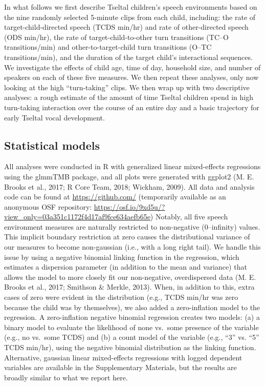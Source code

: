 \documentclass[floatsintext,man]{apa6}
\theoremstyle{definition}
\theoremstyle{definition}
\theoremstyle{definition}
\theoremstyle{remark}
\begin{document}
In what follows we first describe Tseltal children's speech environments
based on the nine randomly selected 5-minute clips from each child,
including: the rate of target-child-directed speech (TCDS min/hr) and
rate of other-directed speech (ODS min/hr), the rate of
target-child-to-other turn transitions (TC--O transitions/min) and
other-to-target-child turn transitions (O--TC transitions/min), and the
duration of the target child's interactional sequences. We investigate
the effects of child age, time of day, household size, and number of
speakers on each of these five measures. We then repeat these analyses,
only now looking at the high \enquote{turn-taking} clips. We then wrap
up with two descriptive analyses: a rough estimate of the amount of time
Tseltal children spend in high turn-taking interaction over the course
of an entire day and a basic trajectory for early Tseltal vocal
development.

\subsection{Statistical models}\label{statistical-models}

All analyses were conducted in R with generalized linear mixed-effects
regressions using the glmmTMB package, and all plots were generated with
ggplot2 (M. E. Brooks et al., 2017; R Core Team, 2018; Wickham, 2009).
All data and analysis code can be found at \url{https://github.com/}
(temporarily available as an anonymous OSF repository:
\url{https://osf.io/9xd5u/?view_only=03a351c1172f4d17af9fce634aefb65e})
Notably, all five speech environment measures are naturally restricted
to non-negative (0--infinity) values. This implicit boundary restriction
at zero causes the distributional variance of our measures to become
non-gaussian (i.e., with a long right tail). We handle this issue by
using a negative binomial linking function in the regression, which
estimates a dispersion parameter (in addition to the mean and variance)
that allows the model to more closely fit our non-negative,
overdispersed data (M. E. Brooks et al., 2017; Smithson \& Merkle,
2013). When, in addition to this, extra cases of zero were evident in
the distribution (e.g., TCDS min/hr was zero because the child was by
themselves), we also added a zero-inflation model to the regression. A
zero-inflation negative binomial regression creates two models: (a) a
binary model to evaluate the likelihood of none vs.~some presence of the
variable (e.g., no vs.~some TCDS) and (b) a count model of the variable
(e.g., \enquote{3} vs. \enquote{5} TCDS min/hr), using the negative
binomial distribution as the linking function. Alternative, gaussian
linear mixed-effects regressions with logged dependent variables are
available in the Supplementary Materials, but the results are broadly
similar to what we report here.
\end{document}
